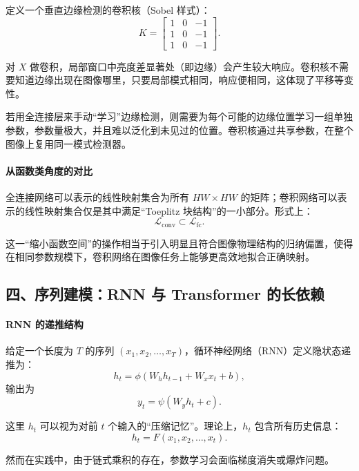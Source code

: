 定义一个垂直边缘检测的卷积核（Sobel 样式）：
\[
K = \begin{bmatrix} 1 & 0 & -1\\ 1 & 0 & -1\\ 1 & 0 & -1 \end{bmatrix}.
\]

对 $X$ 做卷积，局部窗口中亮度差显著处（即边缘）会产生较大响应。卷积核不需要知道边缘出现在图像哪里，只要局部模式相同，响应便相同，这体现了平移等变性。

若用全连接层来手动“学习”边缘检测，则需要为每个可能的边缘位置学习一组单独参数，参数量极大，并且难以泛化到未见过的位置。卷积核通过共享参数，在整个图像上复用同一模式检测器。

\paragraph{从函数类角度的对比}

全连接网络可以表示的线性映射集合为所有 $HW \times HW$ 的矩阵；卷积网络可以表示的线性映射集合仅是其中满足“Toeplitz 块结构”的一小部分。形式上：
\[
\mathcal{L}_{\text{conv}} \subset \mathcal{L}_{\text{fc}}.
\]

这一“缩小函数空间”的操作相当于引入明显且符合图像物理结构的归纳偏置，使得在相同参数规模下，卷积网络在图像任务上能够更高效地拟合正确映射。

\subsection*{四、序列建模：RNN 与 Transformer 的长依赖}

\paragraph{RNN 的递推结构}

给定一个长度为 $T$ 的序列 $(x_1, x_2, \dots, x_T)$，循环神经网络（RNN）定义隐状态递推为：
\[
h_t = \phi(W_h h_{t-1} + W_x x_t + b),
\]
输出为
\[
y_t = \psi(W_y h_t + c).
\]

这里 $h_t$ 可以视为对前 $t$ 个输入的“压缩记忆”。理论上，$h_t$ 包含所有历史信息：
\[
h_t = F(x_1, x_2, \dots, x_t).
\]

然而在实践中，由于链式乘积的存在，参数学习会面临梯度消失或爆炸问题。

